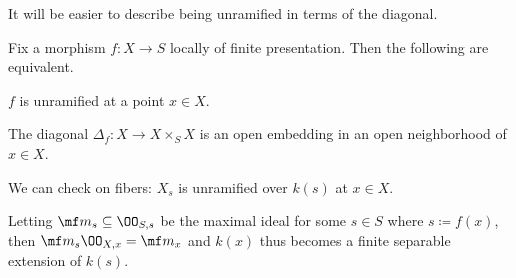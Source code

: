 \documentclass[../notes.tex]{subfiles}
\begin{document}
It will be easier to describe being unramified in terms of the diagonal.
\begin{proposition} \label{prop:unramified-grab-bag}
	Fix a morphism $f\colon X\to S$ locally of finite presentation. Then the following are equivalent.
	\begin{listalph}
		\item $f$ is unramified at a point $x\in X$.
		\item The diagonal $\Delta_f\colon X\to X\times_SX$ is an open embedding in an open neighborhood of $x\in X$.
		\item We can check on fibers: $X_s$ is unramified over $k(s)$ at $x\in X$.
		\item Letting $\mf m_s\subseteq\OO_{S,s}$ be the maximal ideal for some $s\in S$ where $s\coloneqq f(x)$, then $\mf m_s\OO_{X,x}=\mf m_x$ and $k(x)$ thus becomes a finite separable extension of $k(s)$.
	\end{listalph}
\end{proposition}
\end{document}
